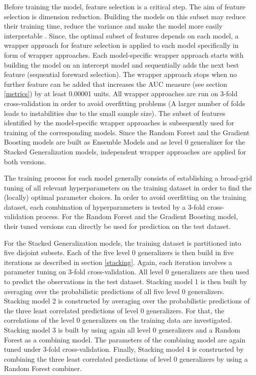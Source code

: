 \documentclass[12pt]{article}
\begin{document}
Before training the model, feature selection is a critical step. The aim of feature selection is dimension reduction. Building the models on this subset may reduce their training time, reduce the variance and make the model more easily interpretable \citep{guyon2003introduction}. Since, the optimal subset of features depends on each model, a wrapper approach for feature selection is applied to each model specifically in form of wrapper approaches. Each model-specific wrapper approach starts with building the model on an intercept model and sequentially adds the next best feature (sequential foreward selection). The wrapper approach stops when no further feature can be added that increases the AUC measure (see section \ref{metrics}) by at least 0.00001 units. All wrapper approaches are run on 3-fold cross-validation in order to avoid overfitting problems (A larger number of folds leads to instabilities due to the small sample size). The subset of features identified by the model-specific wrapper approaches is subsequently used for training of the corresponding models. Since the Random Forest and the Gradient Boosting models are built as Ensemble Models and as level 0 generalizer for the Stacked Generalization models, independent wrapper approaches are applied for both versions.

The training process for each model generally consists of establishing a broad-grid tuning of all relevant hyperparameters on the training dataset in order to find the (locally) optimal parameter choices. In order to avoid overfitting on the training dataset, each combination of hyperparameters is tested by a 3-fold cross-validation process. For the Random Forest and the Gradient Boosting model, their tuned versions can directly be used for prediction on the test dataset.

For the Stacked Generalization models, the training dataset is partitioned into five disjoint subsets. Each of the five level 0 generalizers is then build in five iterations as described in section \ref{stacking}. Again, each iteration involves a parameter tuning on 3-fold cross-validation. All level 0 generalizers are then used to predict the observations in the test dataset. Stacking model 1 is then built by averaging over the probabilistic predictions of all five level 0 generalizers. Stacking model 2 is constructed by averaging over the probabilistic predictions of the three least correlated predictions of level 0 generalizers. For that, the correlations of the level 0 generalizers on the training data are investigated. Stacking model 3 is built by using again all level 0 generalizers and a Random Forest as a combining model. The parameters of the combining model are again tuned under 3-fold cross-validation. Finally, Stacking model 4 is constructed by combining the three least correlated predictions of level 0 generalizers by using a Random Forest combiner.
\end{document}
